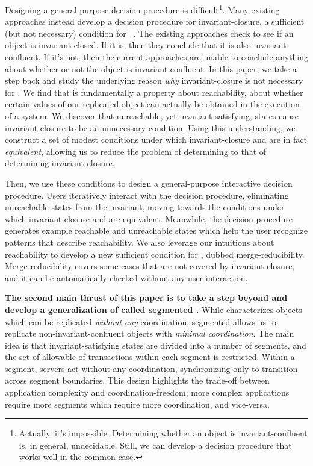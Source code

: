 Designing a general-purpose \invariantconfluence{} decision procedure is
difficult\footnote{Actually, it's impossible. Determining whether an object is
invariant-confluent is, in general, undecidable. Still, we can develop a
decision procedure that works well in the common case.}. Many existing
approaches instead develop a decision procedure for invariant-closure, a
sufficient (but not necessary) condition for
\invariantconfluence{}~\cite{li2012making, li2014automating}. The existing
approaches check to see if an object is invariant-closed. If it is, then they
conclude that it is also invariant-confluent. If it's not, then the current
approaches are unable to conclude anything about whether or not the object is
invariant-confluent. In this paper, we take a step back and study the
underlying reason \emph{why} invariant-closure is not necessary for
\invariantconfluence{}. We find that \invariantconfluence{} is fundamentally a
property about reachability, about whether certain values of our replicated
object can actually be obtained in the execution of a system. We discover that
unreachable, yet invariant-satisfying, states cause invariant-closure to be an
unnecessary condition. Using this understanding, we construct a set of modest
conditions under which invariant-closure and \invariantconfluence{} are in fact
\emph{equivalent}, allowing us to reduce the problem of determining
\invariantconfluence{} to that of determining invariant-closure.

Then, we use these conditions to design a general-purpose interactive
\invariantconfluence{} decision procedure. Users iteratively interact with the
decision procedure, eliminating unreachable states from the invariant, moving
towards the conditions under which invariant-closure and \invariantconfluence{}
are equivalent. Meanwhile, the decision-procedure generates example reachable
and unreachable states which help the user recognize patterns that describe
reachability. We also leverage our intuitions about reachability to develop a
new sufficient condition for \invariantconfluence{}, dubbed merge-reducibility.
Merge-reducibility covers some cases that are not covered by invariant-closure,
and it can be automatically checked without any user interaction.

\textbf{The second main thrust of this paper is to take a step beyond
  \invariantconfluence{} and develop a generalization of \invariantconfluence{}
called segmented \invariantconfluence{}.} While \invariantconfluence{}
characterizes objects which can be replicated \emph{without any} coordination,
segmented \invariantconfluence{} allows us to replicate non-invariant-confluent
objects with \emph{minimal coordination}. The main idea is that
invariant-satisfying states are divided into a number of segments, and the set
of allowable of transactions within each segment is restricted. Within a
segment, servers act without any coordination, synchronizing only to transition
across segment boundaries. This design highlights the trade-off between
application complexity and coordination-freedom; more complex applications
require more segments which require more coordination, and vice-versa.

